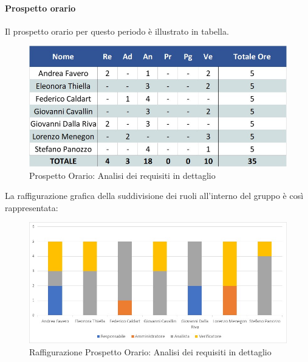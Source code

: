 \paragraph{Prospetto orario}
Il prospetto orario per questo periodo è illustrato in tabella.
\begin{figure}[H]
	\centerline{\includegraphics[scale=0.7]{img/Preventivo/AnalisiRequisitiDettaglioOrario.jpg}}
	\caption{Prospetto Orario: Analisi dei requisiti in dettaglio}
	\clearpage
\end{figure}
La raffigurazione grafica della suddivisione dei ruoli all'interno del gruppo è così rappresentata: 
\begin{figure}[H]
	\centerline{\includegraphics[scale=0.85]{img/Preventivo/Istogrammi/AnalisiRequisitiDettaglio.jpg}}
	\caption{Raffigurazione Prospetto Orario: Analisi dei requisiti in dettaglio}
	\clearpage
\end{figure}
\newpage
